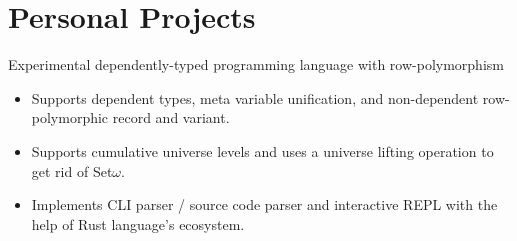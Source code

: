 \documentclass{resume}
\begin{document}
\section{Personal Projects}


Experimental dependently-typed programming language with row-polymorphism
\begin{itemize}
  \item Supports dependent types, meta variable unification, and non-dependent row-polymorphic record and variant.
  \item Supports cumulative universe levels and uses a universe lifting operation to get rid of Set$\omega$.
  \item Implements CLI parser / source code parser and interactive REPL with the help of Rust language's ecosystem.
\end{itemize}
\end{document}
